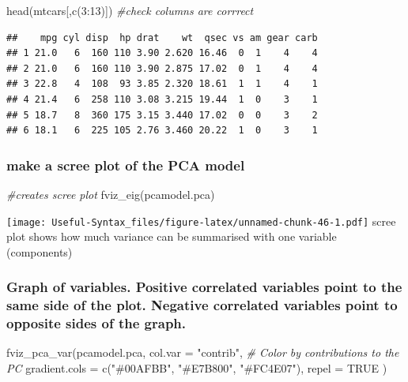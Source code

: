 \documentclass[
]{article}
\newenvironment{Shaded}{\begin{snugshade}}{\end{snugshade}}
\newcommand{\AttributeTok}[1]{\textcolor[rgb]{0.77,0.63,0.00}{#1}}
\newcommand{\CommentTok}[1]{\textcolor[rgb]{0.56,0.35,0.01}{\textit{#1}}}
\newcommand{\ConstantTok}[1]{\textcolor[rgb]{0.00,0.00,0.00}{#1}}
\newcommand{\DecValTok}[1]{\textcolor[rgb]{0.00,0.00,0.81}{#1}}
\newcommand{\FunctionTok}[1]{\textcolor[rgb]{0.00,0.00,0.00}{#1}}
\newcommand{\NormalTok}[1]{#1}
\newcommand{\SpecialCharTok}[1]{\textcolor[rgb]{0.00,0.00,0.00}{#1}}
\newcommand{\StringTok}[1]{\textcolor[rgb]{0.31,0.60,0.02}{#1}}
\begin{document}
\begin{Shaded}
\begin{Highlighting}[]
\FunctionTok{head}\NormalTok{(mtcars[,}\FunctionTok{c}\NormalTok{(}\DecValTok{3}\SpecialCharTok{:}\DecValTok{13}\NormalTok{)]) }\CommentTok{\#check columns are corrrect}
\end{Highlighting}
\end{Shaded}

\begin{verbatim}
##    mpg cyl disp  hp drat    wt  qsec vs am gear carb
## 1 21.0   6  160 110 3.90 2.620 16.46  0  1    4    4
## 2 21.0   6  160 110 3.90 2.875 17.02  0  1    4    4
## 3 22.8   4  108  93 3.85 2.320 18.61  1  1    4    1
## 4 21.4   6  258 110 3.08 3.215 19.44  1  0    3    1
## 5 18.7   8  360 175 3.15 3.440 17.02  0  0    3    2
## 6 18.1   6  225 105 2.76 3.460 20.22  1  0    3    1
\end{verbatim}

\hypertarget{make-a-scree-plot-of-the-pca-model}{%
\subsubsection{make a scree plot of the PCA model}\label{make-a-scree-plot-of-the-pca-model}}

\begin{Shaded}
\begin{Highlighting}[]
\CommentTok{\#creates scree plot}
\FunctionTok{fviz\_eig}\NormalTok{(pcamodel.pca)}
\end{Highlighting}
\end{Shaded}

\texttt{[image: Useful-Syntax\_files/figure-latex/unnamed-chunk-46-1.pdf]}
scree plot shows how much variance can be summarised with one variable (components)

\hypertarget{graph-of-variables.-positive-correlated-variables-point-to-the-same-side-of-the-plot.-negative-correlated-variables-point-to-opposite-sides-of-the-graph.}{%
\subsubsection{Graph of variables. Positive correlated variables point to the same side of the plot. Negative correlated variables point to opposite sides of the graph.}\label{graph-of-variables.-positive-correlated-variables-point-to-the-same-side-of-the-plot.-negative-correlated-variables-point-to-opposite-sides-of-the-graph.}}

\begin{Shaded}
\begin{Highlighting}[]
\FunctionTok{fviz\_pca\_var}\NormalTok{(pcamodel.pca,}
             \AttributeTok{col.var =} \StringTok{"contrib"}\NormalTok{, }\CommentTok{\# Color by contributions to the PC}
             \AttributeTok{gradient.cols =} \FunctionTok{c}\NormalTok{(}\StringTok{"\#00AFBB"}\NormalTok{, }\StringTok{"\#E7B800"}\NormalTok{, }\StringTok{"\#FC4E07"}\NormalTok{),}
             \AttributeTok{repel =} \ConstantTok{TRUE}\NormalTok{   )}
\end{Highlighting}
\end{Shaded}
\end{document}

